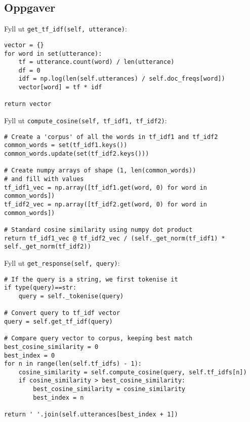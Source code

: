\documentclass{article}
\begin{document}
\subsection*{Oppgaver}
\begin{outline}[enumerate]
\1 Fyll ut \verb|get_tf_idf(self, utterance)|:
\begin{verbatim}
vector = {}
for word in set(utterance):
    tf = utterance.count(word) / len(utterance)
    df = 0
    idf = np.log(len(self.utterances) / self.doc_freqs[word])
    vector[word] = tf * idf

return vector
\end{verbatim}

\1 Fyll ut \verb|compute_cosine(self, tf_idf1, tf_idf2)|:
\begin{verbatim}
# Create a 'corpus' of all the words in tf_idf1 and tf_idf2
common_words = set(tf_idf1.keys())
common_words.update(set(tf_idf2.keys()))

# Create numpy arrays of shape (1, len(common_words)) 
# and fill with values
tf_idf1_vec = np.array([tf_idf1.get(word, 0) for word in common_words])
tf_idf2_vec = np.array([tf_idf2.get(word, 0) for word in common_words])

# Standard cosine similarity using numpy dot product
return tf_idf1_vec @ tf_idf2_vec / (self._get_norm(tf_idf1) * self._get_norm(tf_idf2))
\end{verbatim}

\1 Fyll ut \verb|get_response(self, query)|:
\begin{verbatim}
# If the query is a string, we first tokenise it
if type(query)==str:
    query = self._tokenise(query)

# Convert query to tf_idf vector
query = self.get_tf_idf(query)

# Compare query vector to corpus, keeping best match
best_cosine_similarity = 0
best_index = 0
for n in range(len(self.tf_idfs) - 1):
    cosine_similarity = self.compute_cosine(query, self.tf_idfs[n])
    if cosine_similarity > best_cosine_similarity:
        best_cosine_similarity = cosine_similarity
        best_index = n

return ' '.join(self.utterances[best_index + 1])
\end{verbatim}
\end{outline}
\end{document}
